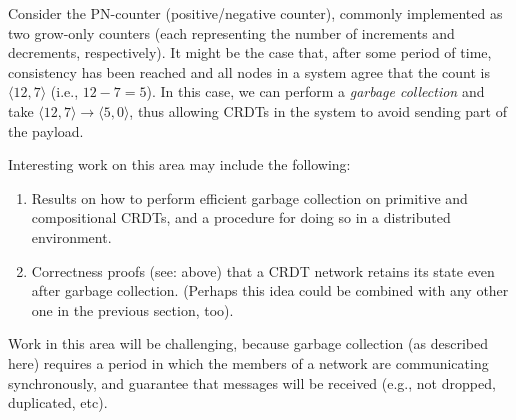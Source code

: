 \documentclass{article}
\begin{document}
  Consider the PN-counter (positive/negative counter), commonly implemented as
  two grow-only counters (each representing the number of increments and
  decrements, respectively). It might be the case that, after some period of
  time, consistency has been reached and all nodes in a system agree that the
  count is $\langle12,7\rangle$ (i.e., $12-7=5$). In this case, we can perform a
  \textit{garbage collection} and take $\langle12,7\rangle\to\langle5,0\rangle$,
  thus allowing CRDTs in the system to avoid sending part of the payload.

  Interesting work on this area may include the following:
  \begin{enumerate}
    \item Results on how to perform efficient garbage collection on primitive
      and compositional CRDTs, and a procedure for doing so in a distributed
      environment.
    \item Correctness proofs (see: above) that a CRDT network retains its state
      even after garbage collection. (Perhaps this idea could be combined with
      any other one in the previous section, too).
  \end{enumerate}

  Work in this area will be challenging, because garbage collection (as
  described here) requires a period in which the members of a network are
  communicating synchronously, and guarantee that messages will be received
  (e.g., not dropped, duplicated, etc).

  \printbibliography
\end{document}
